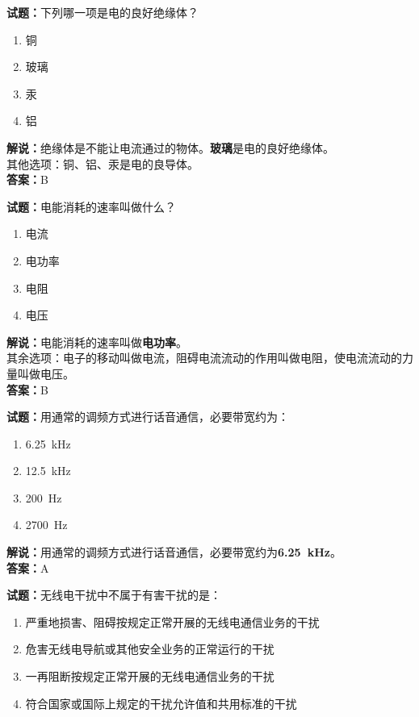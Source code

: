 \documentclass{ctexbook}
\begin{document}
\noindent\textbf{试题：}下列哪一项是电的良好绝缘体？

\begin{enumerate}[leftmargin=3em]
  \item 铜
  \item 玻璃
  \item 汞
  \item 铝
\end{enumerate}

\noindent\textbf{解说：}绝缘体是不能让电流通过的物体。\textbf{玻璃}是电的良好绝缘体。\cite{Resistivity_and_conductivity_of_various_materials}\\
其他选项：铜、铝、汞是电的良导体。\\
\noindent\textbf{答案：}B

\bigskip

\noindent\textbf{试题：}电能消耗的速率叫做什么？

\begin{enumerate}[leftmargin=3em]
  \item 电流
  \item 电功率
  \item 电阻
  \item 电压
\end{enumerate}

\noindent\textbf{解说：}电能消耗的速率叫做\textbf{电功率}。\\
其余选项：电子的移动叫做电流，阻碍电流流动的作用叫做电阻，使电流流动的力量叫做电压。\\
\noindent\textbf{答案：}B

\bigskip

\noindent\textbf{试题：}用通常的调频方式进行话音通信，必要带宽约为：

\begin{enumerate}[leftmargin=3em]
  \item \qty{6.25}{\kHz}
  \item \qty{12.5}{\kHz}
  \item \qty{200}{\Hz}
  \item \qty{2700}{\Hz}
\end{enumerate}

\noindent\textbf{解说：}用通常的调频方式进行话音通信，必要带宽约为\textbf{\qty{6.25}{\kHz}}。\\
\noindent\textbf{答案：}A

\bigskip

\noindent\textbf{试题：}无线电干扰中不属于有害干扰的是：

\begin{enumerate}[leftmargin=3em]
  \item 严重地损害、阻碍按规定正常开展的无线电通信业务的干扰
  \item 危害无线电导航或其他安全业务的正常运行的干扰
  \item 一再阻断按规定正常开展的无线电通信业务的干扰
  \item 符合国家或国际上规定的干扰允许值和共用标准的干扰
\end{enumerate}
\end{document}
